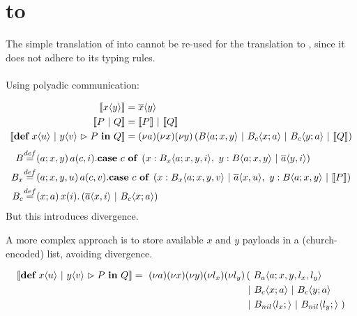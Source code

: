 \section{\MonadicJoinCalc to \ActorPiCalc}

The simple translation of \joincalc into \asyncpicalc \cite{fournet_reflexive_1996} cannot be re-used for the translation to \actorpicalc,
since it does not adhere to its typing rules.
\\
\\
Using polyadic communication:

\begin{align}
  \begin{split}
    \encMJtoAP{\jsnd{x}{y}}
    &= \asnd{x}{y} \\
    \encMJtoAP{P \jpar Q}
    &= \encMJtoAP{P} \apar \encMJtoAP{Q} \\
    \encMJtoAP{\jdef{\jrct{\jrcv{x}{u} \jpat \jrcv{y}{v}}{P}}{Q}}
    &= \anew{a}{\anew{x}{\anew*{y}{ \ains{B}{a}{x,y} \apar \ains{B_c}{x}{a} \apar \ains{B_c}{y}{a} \apar \encMJtoAP{Q}}}} \\
  \end{split}
\end{align}
\begin{align}
  \adef*{B}{a}{x,y}{
    \arcv{a}{c,i} . \acse{c}{
       \aalt{x}{\ains{B_x}{a}{x,y,i}},\ 
       \aalt{y}{\ains{B}{a}{x,y} \apar \asnd{a}{y,i}}
     }
  } \\
  \adef*{B_x}{a}{x,y,u}{
    \arcv{a}{c,v} . \acse{c}{
      \aalt{x}{\ains{B_x}{a}{x,y,v} \apar \asnd{a}{x,u}},\ 
      \aalt{y}{\ains{B}{a}{x,y} \apar \encMJtoAP{P}}
    } \\
  }
  \adef*{B_c}{x}{a}{
    \arcv{x}{i} . \parens{\asnd{a}{x,i} \apar \ains{B_c}{x}{a}}
  }
\end{align}
But this introduces divergence.


A more complex approach is to store available $x$ and $y$ payloads in a (church-encoded) list, avoiding divergence.

\begin{align}
  \encMJtoAP{\jdef{\jrct{\jrcv{x}{u} \jpat \jrcv{y}{v}}{P}}{Q}}
  =\
  \anew{a}{\anew{x}{\anew{y}{\anew{l_x}{\anew{l_y}{
    &\left(\ \ains{B_a}{a}{x, y, l_x, l_y} \right. \nonumber \\
    &\apar \ains{B_c}{x}{a} \apar \ains{B_c}{y}{a} \nonumber \\
    &\apar \ains{B_{nil}}{l_x}{} \apar \ains{B_{nil}}{l_y}{} \left.\right)
  }}}}}
\end{align}

